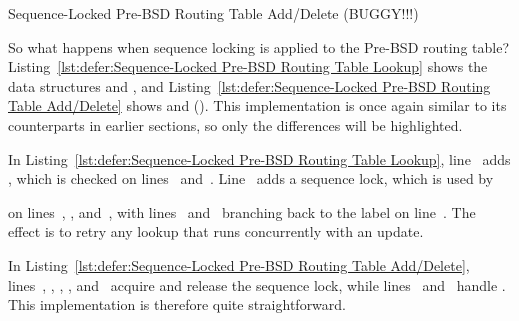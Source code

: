 \begin{listing}[tbp]

\caption{Sequence-Locked Pre-BSD Routing Table Add\slash Delete (BUGGY!!!)}
\label{lst:defer:Sequence-Locked Pre-BSD Routing Table Add/Delete}
\end{listing}

So what happens when sequence locking is applied to the Pre-BSD
routing table?
Listing~\ref{lst:defer:Sequence-Locked Pre-BSD Routing Table Lookup}
shows the data structures and , and
Listing~\ref{lst:defer:Sequence-Locked Pre-BSD Routing Table Add/Delete}
shows  and  ().
This implementation is once again similar to its counterparts in earlier
sections, so only the differences will be highlighted.

\begin{fcvref}
In
Listing~\ref{lst:defer:Sequence-Locked Pre-BSD Routing Table Lookup},
line~ adds , which is checked on
lines~ and~.
Line~ adds a sequence lock, which is used by 
\end{fcvref}
\begin{fcvref}
on lines~, , and~,
with lines~ and~ branching back to
the  label on line~.
The effect is to retry any lookup that runs concurrently with an update.
\end{fcvref}

\begin{fcvref}
In
Listing~\ref{lst:defer:Sequence-Locked Pre-BSD Routing Table Add/Delete},
lines~, , ,
, and~
acquire and release the sequence lock,
while lines~ and~ handle .
This implementation is therefore quite straightforward.
\end{fcvref}

